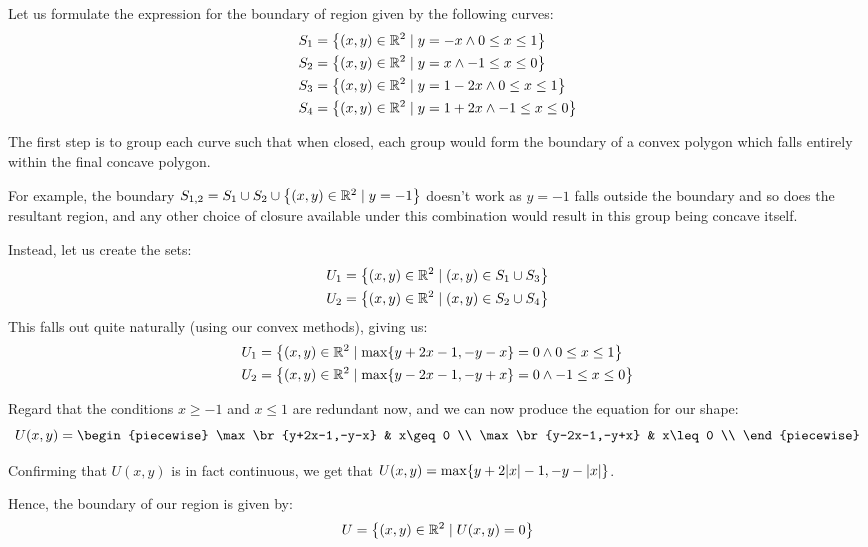 \begin{example}
    Let us formulate the expression for the boundary of region given by the following curves:
    \begin{align*}
        S_1 &= \br*{(x,y)\in\mathbb{R}^2\mid y=-x\land 0\leq x\leq 1} \\
        S_2 &= \br*{(x,y)\in\mathbb{R}^2\mid y=x\land -1\leq x\leq 0} \\
        S_3 &= \br*{(x,y)\in\mathbb{R}^2\mid y=1-2x\land 0\leq x\leq 1} \\
        S_4 &= \br*{(x,y)\in\mathbb{R}^2\mid y=1+2x\land -1\leq x\leq 0}
    \end{align*}

    The first step is to group each curve such that when closed, each group would form the boundary of a convex polygon which falls entirely within the final concave polygon.

    For example, the boundary $S_{1,2}=S_1\cup S_2\cup \br*{(x,y)\in\mathbb{R}^2\mid y=-1}$ doesn't work as $y=-1$ falls outside the boundary and so does the resultant region, and any other choice of closure available under this combination would result in this group being concave itself.

    Instead, let us create the sets:
    \begin{align*}
        U_1=\br*{(x,y)\in\mathbb{R}^2\mid (x,y)\in S_1\cup S_3} \\
        U_2=\br*{(x,y)\in\mathbb{R}^2\mid (x,y)\in S_2\cup S_4}
    \end{align*}
    This falls out quite naturally (using our convex methods), giving us:
    \begin{align*}
        U_1 &= \br*{(x,y)\in\mathbb{R}^2\mid \max\br{y+2x-1,-y-x}=0\land 0\leq x\leq 1} \\
        U_2 &= \br*{(x,y)\in\mathbb{R}^2\mid \max\br{y-2x-1,-y+x}=0\land -1\leq x\leq 0}
    \end{align*}

    Regard that the conditions $x\geq -1$ and $x\leq 1$ are redundant now, and we can now produce the equation for our shape:
    $$
        U(x,y) = \begin{piecewise}
            \max\br{y+2x-1,-y-x} & x\geq 0 \\
            \max\br{y-2x-1,-y+x} & x\leq 0 \\
        \end{piecewise}
    $$

    Confirming that $U(x,y)$ is in fact continuous, we get that $U(x,y)=\max\br{y+2\abs{x}-1,-y-\abs{x}}$.

    Hence, the boundary of our region is given by:
    $$
        U = \br*{(x,y)\in\mathbb{R}^2\mid U(x,y)=0}
    $$
\end{example}

